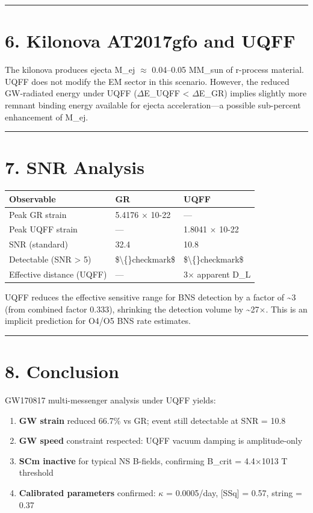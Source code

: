\documentclass[11pt]{article}
\begin{document}
\noindent\rule{\textwidth}{0.4pt}

\section*{6. Kilonova AT2017gfo and UQFF}

The kilonova produces ejecta M\_ej $\approx$ 0.04--0.05 MM\_sun of r-process material. UQFF does not modify the EM sector in this scenario. However, the reduced GW-radiated energy under UQFF ($\Delta$E\_UQFF < $\Delta$E\_GR) implies slightly more remnant binding energy available for ejecta acceleration---a possible sub-percent enhancement of M\_ej.

\noindent\rule{\textwidth}{0.4pt}

\section*{7. SNR Analysis}

\begin{center}
\begin{longtable}{lll}
\toprule
Observable & GR & UQFF \tabularnewline
\midrule
\endhead
Peak GR strain & 5.4176 $\times$ 10-22 & --- \tabularnewline
Peak UQFF strain & --- & 1.8041 $\times$ 10-22 \tabularnewline
SNR (standard) & 32.4 & 10.8 \tabularnewline
Detectable (SNR > 5) & \$\textbackslash\{\}checkmark\$ & \$\textbackslash\{\}checkmark\$ \tabularnewline
Effective distance (UQFF) & --- & 3$\times$ apparent D\_L \tabularnewline
\bottomrule
\end{longtable}
\end{center}

UQFF reduces the effective sensitive range for BNS detection by a factor of \textasciitilde{}3 (from combined factor 0.333), shrinking the detection volume by \textasciitilde{}27$\times$. This is an implicit prediction for O4/O5 BNS rate estimates.

\noindent\rule{\textwidth}{0.4pt}

\section*{8. Conclusion}

GW170817 multi-messenger analysis under UQFF yields:

\begin{enumerate}
  \item \textbf{GW strain} reduced 66.7\% vs GR; event still detectable at SNR = 10.8
  \item \textbf{GW speed} constraint respected: UQFF vacuum damping is amplitude-only
  \item \textbf{SCm inactive} for typical NS B-fields, confirming B\_crit = 4.4$\times$1013 T threshold
  \item \textbf{Calibrated parameters} confirmed: $\kappa$ = 0.0005/day, [SSq] = 0.57, string = 0.37
\end{enumerate}
\end{document}
